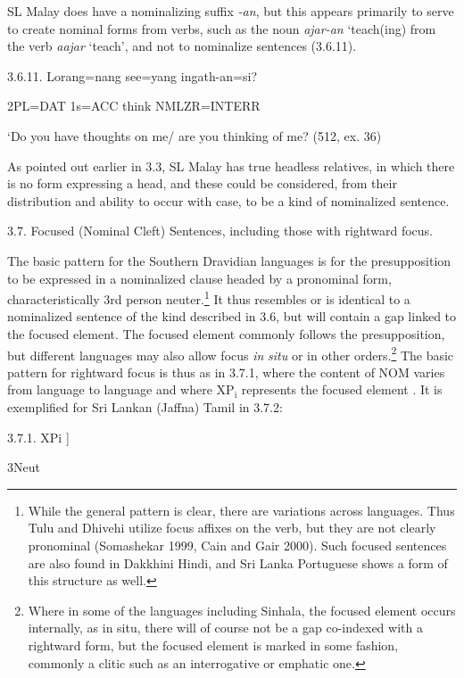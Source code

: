 \documentclass[letterpaper]{article}
\newcommand\textsubscript[1]{\ensuremath{{}_{\text{#1}}}}
\begin{document}
 SL Malay does have a nominalizing suffix \textit{-an}, but this appears primarily to serve to create nominal forms from verbs, such as the noun \textit{ajar-an} `teach(ing)  from the verb \textit{aajar} `teach', and not to nominalize sentences (3.6.11).

 3.6.11.
\ea
\gll  Lorang=nang see=yang ingath-an=si?

  2PL=DAT  1s=ACC  think NMLZR=INTERR

  `Do you have thoughts on me/ are you thinking of me?   (512, ex. 36)

 As pointed out earlier in 3.3, SL Malay has true headless relatives, in which there is no form expressing a head, and these  could be considered, from their distribution and ability to occur with case, to be a kind of nominalized sentence.

3.7. Focused (Nominal Cleft) Sentences, including those with rightward focus.

 The basic pattern for the Southern Dravidian languages is for the presupposition to be expressed in a nominalized clause headed by a pronominal form, characteristically 3rd person neuter.\footnote{While
  the general pattern is clear, there are variations across languages. Thus Tulu and Dhivehi utilize focus affixes on the verb, but they are not clearly pronominal (Somashekar 1999, Cain and Gair 2000). Such focused sentences are also found in Dakkhini Hindi, and Sri Lanka Portuguese shows a form of this structure as well.
}
 It thus resembles or is identical to a nominalized sentence of the kind described in 3.6, but will contain a gap linked to the focused element. The focused element commonly follows the presupposition, but different languages may also allow focus \textit{in} \textit{situ} or in other orders.\footnote{Where
  in some of the languages including Sinhala, the focused element occurs internally, as in situ, there will of course not be a gap co-indexed with a rightward form, but the focused element is marked in some fashion, commonly a clitic such as an interrogative or emphatic one.
}  
The basic pattern for rightward focus is thus as in 3.7.1, where the content of NOM varies from language to language and  where XP\textsubscript{i} represents the focused element . It is exemplified for Sri Lankan (Jaffna) Tamil in 3.7.2:

 3.7.1.
\ea
\gll  [\-\textsubscript{S}\textsubscript{ }[\-\textsubscript{S}{\dots}{\O}\textsubscript{i} {\dots}V-TNS-REL-NOM]  XPi ]

         3Neut 
\end{document}
